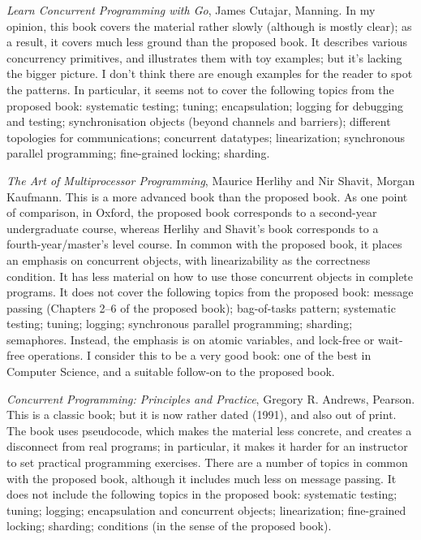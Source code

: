 \documentclass[12pt,a4paper]{article}
\begin{document}

\emph{Learn Concurrent Programming with Go},  James Cutajar, Manning.
In my opinion, this book covers the material rather slowly (although is mostly
clear); as a result, it covers much less ground than the proposed book.  It
describes various concurrency primitives, and illustrates them with toy
examples; but it's lacking the bigger picture.  I don't think there are enough
examples for the reader to spot the patterns.
%
In particular, it seems not to cover the
following topics from the proposed book: systematic testing; 
tuning; encapsulation; logging for debugging and testing; synchronisation
objects (beyond channels and barriers); different topologies for
communications; concurrent datatypes; linearization; synchronous parallel
programming; fine-grained locking; sharding.


\emph{The Art of Multiprocessor Programming}, Maurice Herlihy and Nir Shavit,
Morgan Kaufmann.  
%
This is a more advanced book than the proposed book.  As one point of
comparison, in Oxford, the proposed book corresponds to a second-year
undergraduate course, whereas Herlihy and Shavit's book corresponds to a
fourth-year/master's level course.  In common with the proposed book, it
places an emphasis on concurrent objects, with linearizability as the
correctness condition.  It has less material on how to use those concurrent
objects in complete programs.  It does not cover the following topics from the
proposed book: message passing (Chapters 2--6 of the proposed book);
bag-of-tasks pattern; systematic testing; tuning; logging; synchronous
parallel programming; sharding; semaphores.  Instead, the emphasis is on
atomic variables, and lock-free or wait-free operations.  I consider this to
be a very good book: one of the best in Computer Science, and a suitable
follow-on to the proposed book.


\emph{Concurrent Programming: Principles and Practice}, Gregory R. Andrews,
Pearson.  This is a classic book; but it is now rather dated (1991), and also
out of print.  The book uses pseudocode, which makes the material less
concrete, and creates a disconnect from real programs; in particular, it makes
it harder for an instructor to set practical programming exercises.  There are
a number of topics in common with the proposed book, although it includes much
less on message passing.  It does not include the following topics in the
proposed book: systematic testing; tuning; logging; encapsulation and
concurrent objects; linearization; fine-grained locking; sharding; conditions
(in the sense of the proposed book).
\end{document}
